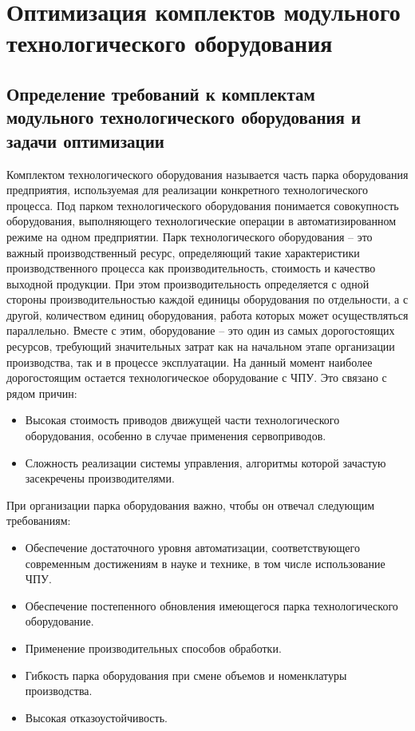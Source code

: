 \section{Оптимизация комплектов модульного технологического оборудования}
	 
\subsection{Определение требований к комплектам модульного технологического оборудования и задачи оптимизации}

Комплектом технологического оборудования называется часть парка оборудования предприятия, используемая для реализации конкретного технологического процесса. Под парком технологического оборудования понимается совокупность оборудования, выполняющего технологические операции в автоматизированном режиме на одном предприятии. Парк технологического оборудования -- это важный производственный ресурс, определяющий такие характеристики производственного процесса как производительность, стоимость и качество выходной продукции. При этом производительность определяется с одной стороны производительностью каждой единицы оборудования по отдельности, а с другой, количеством единиц оборудования, работа которых может осуществляться параллельно.  Вместе с этим, оборудование -- это один из самых дорогостоящих ресурсов, требующий значительных затрат как на начальном этапе организации производства, так и в процессе эксплуатации. На данный момент наиболее дорогостоящим остается технологическое оборудование с ЧПУ. Это связано с рядом причин:

\begin{itemize}
	\item Высокая стоимость приводов движущей части технологического оборудования, особенно в случае применения сервоприводов.
	\item Сложность реализации системы управления, алгоритмы которой зачастую засекречены производителями.
\end{itemize}

При организации парка оборудования важно, чтобы он отвечал следующим требованиям:

\begin{itemize}
	\item Обеспечение достаточного уровня автоматизации, соответствующего современным достижениям в науке и технике, в том числе использование ЧПУ.
	\item Обеспечение постепенного обновления имеющегося парка технологического оборудование.
	\item Применение производительных способов обработки.
	\item Гибкость парка оборудования при смене объемов и номенклатуры производства.
	\item Высокая отказоустойчивость.
\end{itemize}

